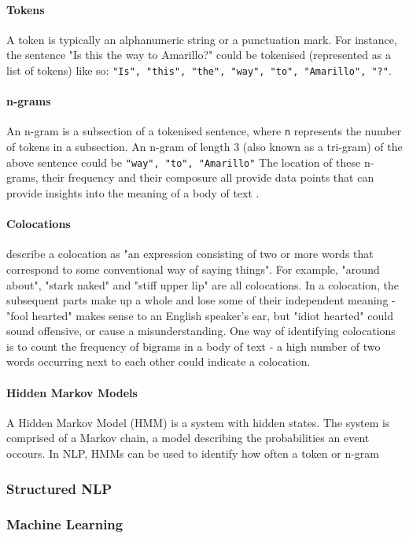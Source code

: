 \paragraph{Tokens}
A token is typically an alphanumeric string or a punctuation mark. For instance, the sentence "Is this the way to Amarillo?" could be tokenised (represented as a list of tokens) like so: \texttt{"Is", "this", "the", "way", "to", "Amarillo", "?"}.\par
	
\paragraph{n-grams}
An n-gram is a subsection of a tokenised sentence, where \texttt{n} represents the number of tokens in a subsection. An n-gram of length 3 (also known as a tri-gram) of the above sentence could be \texttt{"way", "to", "Amarillo"}
	The location of these n-grams, their frequency and their composure all provide data points that can provide insights into the meaning of a body of text \cite{banerjee2003}.
	
\paragraph{Colocations}
\citeauthor{manning1999} describe a colocation as "an expression consisting of two or more words that correspond to some conventional way of saying things". For example, "around about", "stark naked" and "stiff upper lip" are all colocations. In a colocation, the subsequent parts make up a whole and lose some of their independent meaning - "fool hearted" makes sense to an English speaker's ear, but "idiot hearted" could sound offensive, or cause a misunderstanding.
	One way of identifying colocations is to count the frequency of bigrams in a body of text - a high number of two words occurring next to each other could indicate a colocation.

\paragraph{Hidden Markov Models} A Hidden Markov Model (HMM) is a system with hidden states. The system is comprised of a Markov chain, a model describing the probabilities an event occours. In NLP, HMMs can be used to identify how often a token or n-gram  

\subsubsection{Structured NLP}

\subsubsection{Machine Learning}

